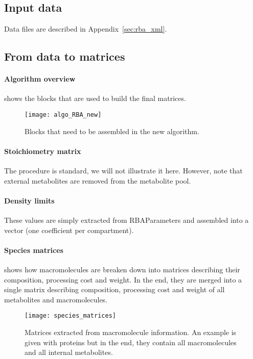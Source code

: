 \subsection{Input data}
Data files are described in Appendix~\ref{sec:rba_xml}.

\subsection{From data to matrices}

\paragraph{Algorithm overview}
 shows the blocks that are used to build the final matrices.
\begin{figure}[ht]
  \centering
  \texttt{[image: algo\_RBA\_new]}
  \caption{Blocks that need to be assembled in the new algorithm.}
  \label{fig:algo_rba_new}
\end{figure}

\paragraph{Stoichiometry matrix} The procedure is standard, we will not illustrate it here. However, note that external metabolites are removed from the metabolite pool.

\paragraph{Density limits} These values are simply extracted from RBAParameters and assembled into a vector (one coefficient per compartment).

\paragraph{Species matrices}  shows how macromolecules are breaken down into matrices describing their composition, processing cost and weight. In the end, they are merged into a single matrix describing composition, processing cost and weight of all metabolites and macromolecules.
\begin{figure}[ht]
  \centering
  \texttt{[image: species\_matrices]}
  \caption{Matrices extracted from macromolecule information. An example is given with proteins but in the end, they contain all macromolecules and all internal metabolites.}
  \label{fig:species_matrices}
\end{figure}

